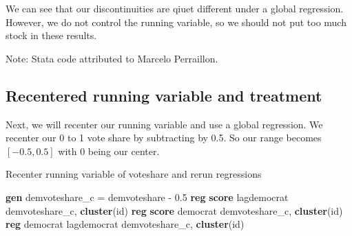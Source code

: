 \documentclass[
]{book}
\newenvironment{Shaded}{\begin{snugshade}}{\end{snugshade}}
\newcommand{\KeywordTok}[1]{\textcolor[rgb]{0.13,0.29,0.53}{\textbf{#1}}}
\newcommand{\NormalTok}[1]{#1}
\begin{document}
We can see that our discontinuities are qiuet different under a global regression. However, we do not control the running variable, so we should not put too much stock in these results.

Note: Stata code attributed to Marcelo Perraillon.

\subsection{Recentered running variable and treatment}\label{recentered-running-variable-and-treatment}

Next, we will recenter our running variable and use a global regression. We recenter our 0 to 1 vote share by subtracting by 0.5. So our range becomes \([-0.5,0.5]\) with 0 being our center.

Recenter running variable of voteshare and rerun regressions

\begin{Shaded}
\begin{Highlighting}[]
\KeywordTok{gen}\NormalTok{ demvoteshare\_c = demvoteshare {-} 0.5}
\KeywordTok{reg} \KeywordTok{score}\NormalTok{ lagdemocrat demvoteshare\_c, }\KeywordTok{cluster}\NormalTok{(id)}
\KeywordTok{reg} \KeywordTok{score}\NormalTok{ democrat demvoteshare\_c, }\KeywordTok{cluster}\NormalTok{(id)}
\KeywordTok{reg}\NormalTok{ democrat lagdemocrat demvoteshare\_c, }\KeywordTok{cluster}\NormalTok{(id)}
\end{Highlighting}
\end{Shaded}
\end{document}
